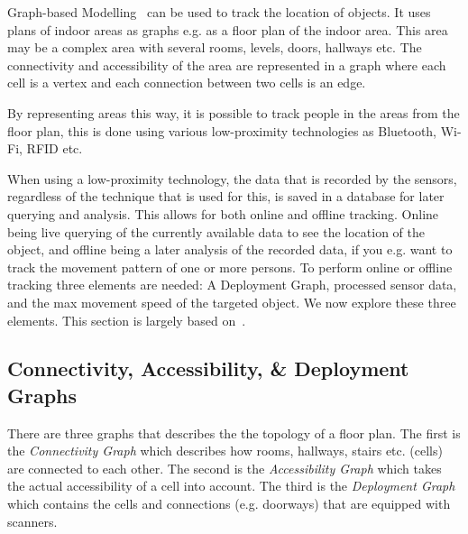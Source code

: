 Graph-based Modelling~\cite{Jensen:2009:GMB:1590953.1591000} can be used to track the location of objects. 
It uses plans of indoor areas as graphs e.g. as a floor plan of the indoor area. 
This area may be a complex area with several rooms, levels, doors, hallways etc. 
The connectivity and accessibility of the area are represented in a graph where each cell is a vertex and each connection between two cells is an edge. 

By representing areas this way, it is possible to track people in the areas from the floor plan, this is done using various low-proximity technologies as Bluetooth, Wi-Fi, RFID etc.

When using a low-proximity technology, the data that is recorded by the sensors, regardless of the technique that is used for this, is saved in a database for later querying and analysis. 
This allows for both online and offline tracking.
Online being live querying of the currently available data to see the location of the object, and offline being a later analysis of the recorded data, if you e.g. want to track the movement pattern of one or more persons. 
To perform online or offline tracking three elements are needed: A Deployment Graph, processed sensor data, and the max movement speed of the targeted object.
We now explore these three elements.
This section is largely based on~\cite{Jensen:2009:GMB:1590953.1591000}.


\subsection{Connectivity, Accessibility, \& Deployment Graphs}
There are three graphs that describes the the topology of a floor plan. 
The first is the \textit{Connectivity Graph} which describes how rooms, hallways, stairs etc. (cells) are connected to each other. 
The second is the \textit{Accessibility Graph} which takes the actual accessibility of a cell into account. 
The third is the \textit{Deployment Graph} which contains the cells and connections (e.g. doorways) that are equipped with scanners.


